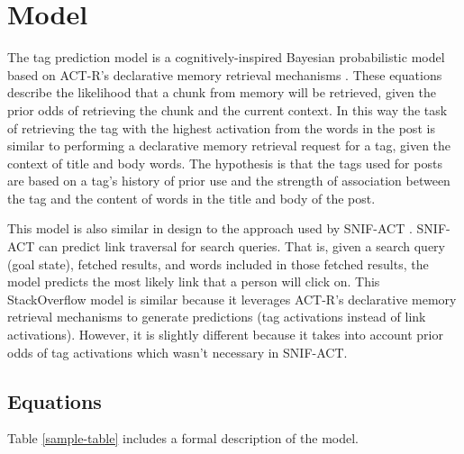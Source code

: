 \documentclass[10pt,letterpaper]{article}
\begin{document}
\section{Model}

The tag prediction model is a cognitively-inspired Bayesian probabilistic model based on ACT-R's declarative memory retrieval mechanisms \cite{Anderson2004}.
These equations describe the likelihood that a chunk from memory will be retrieved, given the prior odds of retrieving the chunk and the current context.
In this way the task of retrieving the tag with the highest activation from the words in the post is similar to performing a declarative memory retrieval request for a tag, given the context of title and body words.
The hypothesis is that the tags used for posts are based on a tag's history of prior use and the strength of association between the tag and the content of words in the title and body of the post.

This model is also similar in design to the approach used by SNIF-ACT \cite{Fu2007}.
SNIF-ACT can predict link traversal for search queries.
That is, given a search query (goal state), fetched results, and words included in those fetched results, the model predicts the most likely link that a person will click on.
This StackOverflow model is similar because it leverages ACT-R's declarative memory retrieval mechanisms to generate predictions (tag activations instead of link activations).
However, it is slightly different because it takes into account prior odds of tag activations which wasn't necessary in SNIF-ACT.

\subsection{Equations}

Table \ref{sample-table} includes a formal description of the model.

\vspace{-1em}
\end{document}
